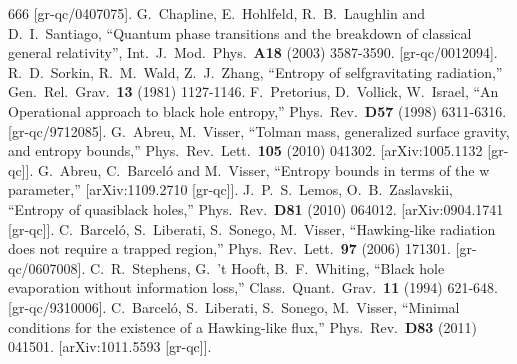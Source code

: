 \documentclass[11pt,a4paper]{article}
\begin{document}
\begin{thebibliography}{666}
  [gr-qc/0407075].
G.~Chapline, E.~Hohlfeld, R.~B.~Laughlin and D.~I.~Santiago,
``Quantum phase transitions and the breakdown of classical general relativity'',
  Int.\ J.\ Mod.\ Phys.\  {\bf A18 } (2003)  3587-3590.
  [gr-qc/0012094].
  R.~D.~Sorkin, R.~M.~Wald, Z.~J.~Zhang,
  ``Entropy of selfgravitating radiation,''
  Gen.\ Rel.\ Grav.\  {\bf 13 } (1981)  1127-1146.
   F.~Pretorius, D.~Vollick, W.~Israel,
   ``An Operational approach to black hole entropy,''
   Phys.\ Rev.\  {\bf D57 } (1998)  6311-6316.
   [gr-qc/9712085].
  G.~Abreu, M.~Visser,
  ``Tolman mass, generalized surface gravity, and entropy bounds,''
  Phys.\ Rev.\ Lett.\  {\bf 105 } (2010)  041302.
  [arXiv:1005.1132 [gr-qc]].
  G.~Abreu, C.~Barcel\'o and M.~Visser,
  ``Entropy bounds in terms of the w parameter,''
  [arXiv:1109.2710 [gr-qc]].
  J.~P.~S.~Lemos, O.~B.~Zaslavskii,
  ``Entropy of quasiblack holes,''
  Phys.\ Rev.\  {\bf D81 } (2010)  064012.
  [arXiv:0904.1741 [gr-qc]].
  C.~Barcel\'o, S.~Liberati, S.~Sonego, M.~Visser,
  ``Hawking-like radiation does not require a trapped region,''
  Phys.\ Rev.\ Lett.\  {\bf 97 } (2006)  171301.
  [gr-qc/0607008].
  C.~R.~Stephens, G.~'t Hooft, B.~F.~Whiting,
  ``Black hole evaporation without information loss,''
  Class.\ Quant.\ Grav.\  {\bf 11 } (1994)  621-648.
  [gr-qc/9310006].
  C.~Barcel\'o, S.~Liberati, S.~Sonego, M.~Visser,
  ``Minimal conditions for the existence of a Hawking-like flux,''
  Phys.\ Rev.\  {\bf D83 } (2011)  041501.
  [arXiv:1011.5593 [gr-qc]].

\end{thebibliography}
\end{document}
